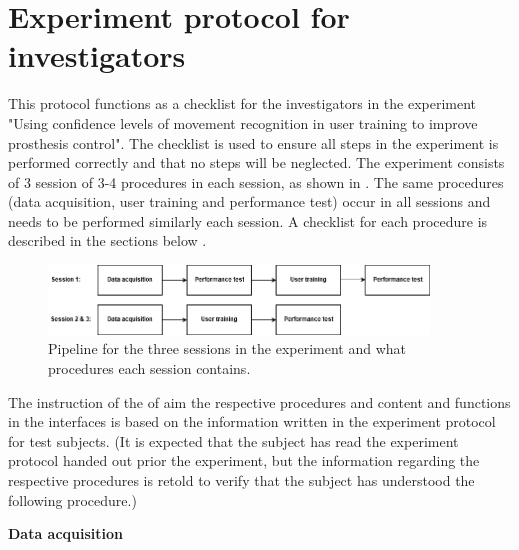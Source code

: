 
\section*{Experiment protocol for investigators}

This protocol functions as a checklist for the investigators in the experiment "Using confidence levels of movement recognition in user training to improve prosthesis control". The checklist is used to ensure all steps in the experiment is performed correctly and that no steps will be neglected. The experiment consists of 3 session of 3-4 procedures in each session, as shown in . The same procedures (data acquisition, user training and performance test) occur in all sessions and needs to be performed similarly each session. A checklist for each procedure is described in the sections below .

\begin{figure}[H]                                         
	\includegraphics[width=0.9\textwidth]{figures/pMethods/experiment_protocol_pipeline}  
	\caption{Pipeline for the three sessions in the experiment and what procedures each session contains.}
	\label{fig:experiment_protocol_pipeline_investigators} 
\end{figure} 

The instruction of the of aim the respective procedures and content and functions in the interfaces is based on the information written in the experiment protocol for test subjects. (It is expected that the subject has read the experiment protocol handed out prior the experiment, but the information regarding the respective procedures is retold to verify that the subject has understood the following procedure.)

\textbf{\large Data acquisition}

